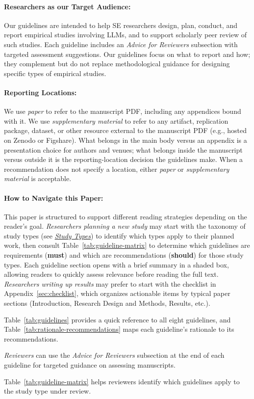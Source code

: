 \documentclass[smallextended]{svjour3}
\newif\ifpaper\papertrue
\newcommand{\must}{\textbf{must}\xspace}
\newcommand{\should}{\textbf{should}\xspace}
\newcommand{\paper}{\emph{paper}\xspace}
\newcommand{\supplementarymaterial}{\emph{supplementary material}\xspace}
\newcommand{\paper}{\emph{paper}\xspace}
\newcommand{\supplementarymaterial}{\emph{supplementary material}\xspace}
\newcommand{\studytypes}{\hyperref[sec:study-types]{\emph{Study Types}}\xspace}
\newcommand{\studytypes}{\href{/study-types}{\emph{Study Types}}\xspace}
\newcommand{\scopeparagraph}[1]{\paragraph{\bfseries #1:}}
\newcommand{\scopeparagraph}[1]{\subsubsection{#1}}
\begin{document}
\scopeparagraph{Researchers as our Target Audience}

Our guidelines are intended to help SE researchers design, plan, conduct,
and report empirical studies involving LLMs, and to support scholarly peer
review of such studies. Each guideline includes an \emph{Advice for
Reviewers} subsection with targeted assessment suggestions.
Our guidelines focus on what to report and how; they complement but do not replace methodological guidance for designing specific types of empirical studies.

\scopeparagraph{Reporting Locations}

We use \paper to refer to the manuscript PDF, including any appendices bound with it. We use \supplementarymaterial to refer to any artifact, replication package, dataset, or other resource external to the manuscript PDF (e.g., hosted on Zenodo or Figshare). What belongs in the main body versus an appendix is a presentation choice for authors and venues; what belongs inside the manuscript versus outside it is the reporting-location decision the guidelines make. When a recommendation does not specify a location, either \paper or \supplementarymaterial is acceptable.

\scopeparagraph{How to Navigate this Paper}

This paper is structured to support different reading strategies depending on the reader's goal.
\emph{Researchers planning a new study} may start with the taxonomy of
study types (see \studytypes) to identify which types apply
to their planned work, then consult
\ifpaper Table~\ref{tab:guideline-matrix} \else the \href{/guidelines/\#guidelines-by-study-type}{applicability matrix} \fi
to determine which guidelines are requirements (\must) and which are
recommendations (\should) for those study types. Each guideline section
opens with a brief summary in a shaded box, allowing
readers to quickly assess relevance before reading the full text.
\emph{Researchers writing up results} may prefer to start with the
\ifpaper checklist in Appendix~\ref{sec:checklist}, \else \href{/checklist/}{checklist}, \fi
which organizes actionable items
by typical paper sections (Introduction, Research Design and Methods, Results, etc.).
\ifpaper
Table~\ref{tab:guidelines} provides a quick reference to all eight
guidelines, and Table~\ref{tab:rationale-recommendations} maps each
guideline's rationale to its recommendations.
\fi
\emph{Reviewers} can use the \emph{Advice for Reviewers} subsection at the
end of each guideline for targeted guidance on assessing manuscripts.
\ifpaper
Table~\ref{tab:guideline-matrix} helps reviewers identify which guidelines
apply to the study type under review.
\fi 
\end{document}

